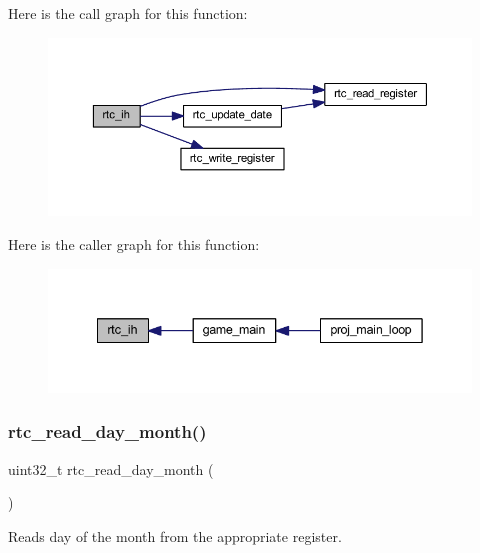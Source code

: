Here is the call graph for this function\+:
\nopagebreak
\begin{figure}[H]
\begin{center}
\leavevmode
\includegraphics[width=350pt]{group__rtc_ga75dad42881d64cf07cf1bdc2979a7056_cgraph}
\end{center}
\end{figure}
Here is the caller graph for this function\+:
\nopagebreak
\begin{figure}[H]
\begin{center}
\leavevmode
\includegraphics[width=342pt]{group__rtc_ga75dad42881d64cf07cf1bdc2979a7056_icgraph}
\end{center}
\end{figure}
\mbox{\label{group__rtc_ga59359f9460af7b7dce7a2c8dc9d98211}} 
\subsubsection{\texorpdfstring{rtc\+\_\+read\+\_\+day\+\_\+month()}{rtc\_read\_day\_month()}}
{\footnotesize\ttfamily uint32\+\_\+t rtc\+\_\+read\+\_\+day\+\_\+month (\begin{DoxyParamCaption}{ }\end{DoxyParamCaption})}



Reads day of the month from the appropriate register. 

